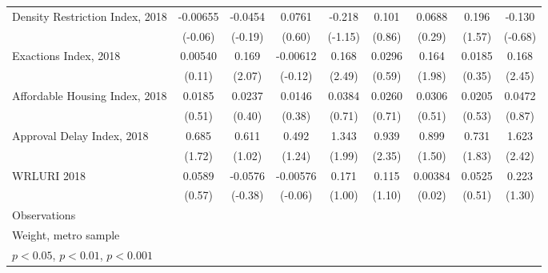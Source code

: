 \begin{table}[htbp]
\begin{tabular}{l*{8}{c}}
\addlinespace
Density Restriction Index, 2018&    -0.00655         &     -0.0454         &      0.0761         &      -0.218         &       0.101         &      0.0688         &       0.196         &      -0.130         \\
                    &     (-0.06)         &     (-0.19)         &      (0.60)         &     (-1.15)         &      (0.86)         &      (0.29)         &      (1.57)         &     (-0.68)         \\
\addlinespace
Exactions Index, 2018&     0.00540         &       0.169\sym{*}  &    -0.00612         &       0.168\sym{*}  &      0.0296         &       0.164\sym{*}  &      0.0185         &       0.168\sym{*}  \\
                    &      (0.11)         &      (2.07)         &     (-0.12)         &      (2.49)         &      (0.59)         &      (1.98)         &      (0.35)         &      (2.45)         \\
\addlinespace
Affordable Housing Index, 2018&      0.0185         &      0.0237         &      0.0146         &      0.0384         &      0.0260         &      0.0306         &      0.0205         &      0.0472         \\
                    &      (0.51)         &      (0.40)         &      (0.38)         &      (0.71)         &      (0.71)         &      (0.51)         &      (0.53)         &      (0.87)         \\
\addlinespace
Approval Delay Index, 2018&       0.685         &       0.611         &       0.492         &       1.343\sym{*}  &       0.939\sym{*}  &       0.899         &       0.731         &       1.623\sym{*}  \\
                    &      (1.72)         &      (1.02)         &      (1.24)         &      (1.99)         &      (2.35)         &      (1.50)         &      (1.83)         &      (2.42)         \\
\addlinespace
WRLURI 2018         &      0.0589         &     -0.0576         &    -0.00576         &       0.171         &       0.115         &     0.00384         &      0.0525         &       0.223         \\
                    &      (0.57)         &     (-0.38)         &     (-0.06)         &      (1.00)         &      (1.10)         &      (0.02)         &      (0.51)         &      (1.30)         \\
\midrule
Observations        &                     &                     &                     &                     &                     &                     &                     &                     \\
\bottomrule
\multicolumn{9}{l}{\footnotesize Weight, metro sample}\\
\multicolumn{9}{l}{\footnotesize \sym{*} \(p<0.05\), \sym{**} \(p<0.01\), \sym{***} \(p<0.001\)}\\
\end{tabular}
\end{table}

